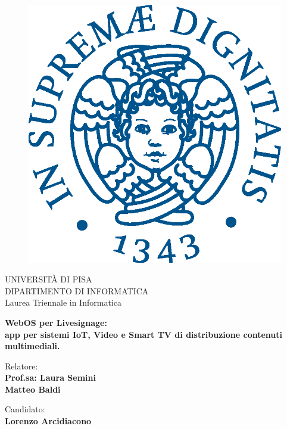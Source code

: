 \begin{titlepage}
\begin{figure}[!htb]
    \centering
    \includegraphics[keepaspectratio=true,scale=0.5]{images/Frontespizio/cherubinFrontespizio.eps}
\end{figure}

\begin{center}
    \LARGE{UNIVERSITÀ DI PISA}
    \vspace{5mm}
    \\ \large{DIPARTIMENTO DI INFORMATICA}
    \vspace{5mm}
    \\ \LARGE{Laurea Triennale in Informatica}
\end{center}

\vspace{15mm}
\begin{center}
    {\LARGE{\bf WebOS per Livesignage:\\ \vspace{5mm} 
    app per sistemi IoT, Video e Smart TV di distribuzione contenuti multimediali.
    }}
\end{center}
\vspace{20mm}

\begin{minipage}[t]{0.47\textwidth}
	{\large{Relatore:}{\normalsize\vspace{3mm}
	\bf\\ \large{Prof.sa: Laura Semini} \normalsize\vspace{3mm}\bf \\ \large{Matteo Baldi}}}
\end{minipage}
\hfill
\begin{minipage}[t]{0.47\textwidth}\raggedleft
	{\large{Candidato:}{\normalsize\vspace{3mm} \bf\\ \large{Lorenzo Arcidiacono}}}
\end{minipage}

\vspace{20mm}
\hrulefill
\\

\end{titlepage}